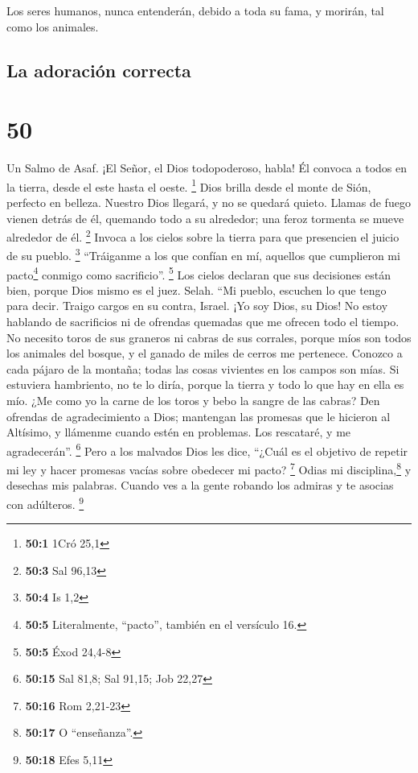  Los seres humanos, nunca entenderán, debido a toda su
fama, y morirán, tal como los animales.

\hypertarget{la-adoraciuxf3n-correcta}{%
\subsection{La adoración correcta}\label{la-adoraciuxf3n-correcta}}

\hypertarget{section-49}{%
\section{50}\label{section-49}}

Un Salmo de Asaf.  ¡El Señor, el Dios todopoderoso, habla!
Él convoca a todos en la tierra, desde el este hasta el oeste.
\footnote{\textbf{50:1} 1Cró 25,1}  Dios brilla desde el
monte de Sión, perfecto en belleza.  Nuestro Dios llegará,
y no se quedará quieto. Llamas de fuego vienen detrás de él, quemando
todo a su alrededor; una feroz tormenta se mueve alrededor de él.
\footnote{\textbf{50:3} Sal 96,13}  Invoca a los cielos
sobre la tierra para que presencien el juicio de su pueblo. \footnote{\textbf{50:4}
  Is 1,2}  ``Tráiganme a los que confían en mí, aquellos
que cumplieron mi pacto\footnote{\textbf{50:5} Literalmente, ``pacto'',
  también en el versículo 16.} conmigo como sacrificio''. \footnote{\textbf{50:5}
  Éxod 24,4-8}  Los cielos declaran que sus decisiones
están bien, porque Dios mismo es el juez. Selah.  ``Mi
pueblo, escuchen lo que tengo para decir. Traigo cargos en su contra,
Israel. ¡Yo soy Dios, su Dios!  No estoy hablando de
sacrificios ni de ofrendas quemadas que me ofrecen todo el tiempo.
 No necesito toros de sus graneros ni cabras de sus
corrales,  porque míos son todos los animales del bosque,
y el ganado de miles de cerros me pertenece.  Conozco a
cada pájaro de la montaña; todas las cosas vivientes en los campos son
mías.  Si estuviera hambriento, no te lo diría, porque la
tierra y todo lo que hay en ella es mío.  ¿Me como yo la
carne de los toros y bebo la sangre de las cabras?  Den
ofrendas de agradecimiento a Dios; mantengan las promesas que le
hicieron al Altísimo,  y llámenme cuando estén en
problemas. Los rescataré, y me agradecerán''. \footnote{\textbf{50:15}
  Sal 81,8; Sal 91,15; Job 22,27}  Pero a los malvados
Dios les dice, ``¿Cuál es el objetivo de repetir mi ley y hacer promesas
vacías sobre obedecer mi pacto? \footnote{\textbf{50:16} Rom 2,21-23}
 Odias mi disciplina,\footnote{\textbf{50:17} O
  ``enseñanza''.} y desechas mis palabras.  Cuando ves a
la gente robando los admiras y te asocias con adúlteros. \footnote{\textbf{50:18}
  Efes 5,11}

